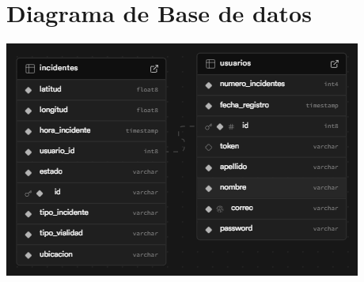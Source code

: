 \section{Diagrama de Base de datos}

\begin{center}
    \includegraphics[scale = .7]{IMA/bd-bumper.png}
\end{center}